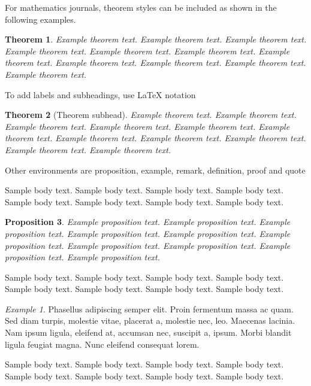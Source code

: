 \documentclass[sn-vancouver,Numbered,pdflatex]{sn-jnl}
\newtheorem{theorem}{Theorem}%
\newtheorem{proposition}[theorem]{Proposition}%
\theoremstyle{remark}
\newtheorem{example}{Example}%
\theoremstyle{definition}
\begin{document}
For mathematics journals, theorem styles can be included as shown in the
following examples.

\begin{theorem}
Example theorem text. Example theorem text. Example theorem text.
Example theorem text. Example theorem text. Example theorem text.
Example theorem text. Example theorem text. Example theorem text.
Example theorem text. Example theorem text.

\end{theorem}

To add labels and subheadings, use LaTeX notation

\begin{theorem}[Theorem subhead]\label{thm1}
Example theorem text. Example theorem text. Example theorem text.
Example theorem text. Example theorem text. Example theorem text.
Example theorem text. Example theorem text. Example theorem text.
Example theorem text. Example theorem text.

\end{theorem}

Other environments are proposition, example, remark, definition, proof
and quote

Sample body text. Sample body text. Sample body text. Sample body text.
Sample body text. Sample body text. Sample body text. Sample body text.

\begin{proposition}
Example proposition text. Example proposition text. Example proposition
text. Example proposition text. Example proposition text. Example
proposition text. Example proposition text. Example proposition text.
Example proposition text. Example proposition text.

\end{proposition}

Sample body text. Sample body text. Sample body text. Sample body text.
Sample body text. Sample body text. Sample body text. Sample body text.

\begin{example}
Phasellus adipiscing semper elit. Proin fermentum massa ac quam. Sed
diam turpis, molestie vitae, placerat a, molestie nec, leo. Maecenas
lacinia. Nam ipsum ligula, eleifend at, accumsan nec, suscipit a, ipsum.
Morbi blandit ligula feugiat magna. Nunc eleifend consequat lorem.

\end{example}

Sample body text. Sample body text. Sample body text. Sample body text.
Sample body text. Sample body text. Sample body text. Sample body text.
\end{document}

